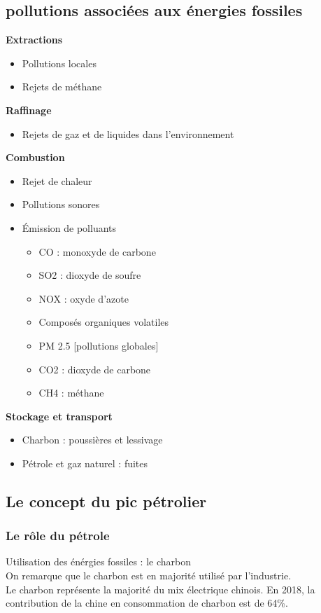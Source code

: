 \documentclass{article}
\begin{document}
\subsection{pollutions associées aux énergies fossiles}
\textbf{Extractions}
\begin{itemize}
	\item Pollutions locales
	\item Rejets de méthane
\end{itemize}
\textbf{Raffinage}
\begin{itemize}
	\item Rejets de gaz et de liquides dans l'environnement
\end{itemize}
\textbf{Combustion}
\begin{itemize}
	\item Rejet de chaleur
	\item Pollutions sonores
	\item Émission de polluants
	\begin{itemize}
	[Pollutions locales]
		\item CO : monoxyde de carbone
		\item SO2 : dioxyde de soufre
		\item NOX : oxyde d'azote
		\item Composés organiques volatiles
		\item PM 2.5
	[pollutions globales]
		\item CO2 : dioxyde de carbone
		\item CH4 : méthane
	\end{itemize}
\end{itemize}
\textbf{Stockage et transport }
\begin{itemize}
	\item Charbon : poussières et lessivage
	\item Pétrole et gaz naturel : fuites
\end{itemize}

\subsection{Le concept du pic pétrolier}
\subsubsection{Le rôle du pétrole}
Utilisation des énérgies fossiles : le charbon \\
On remarque que le charbon est en majorité utilisé par l'industrie. \\
Le charbon représente la majorité du mix électrique chinois. En 2018, la contribution de la chine en consommation de charbon est de 64\%.
\end{document}
